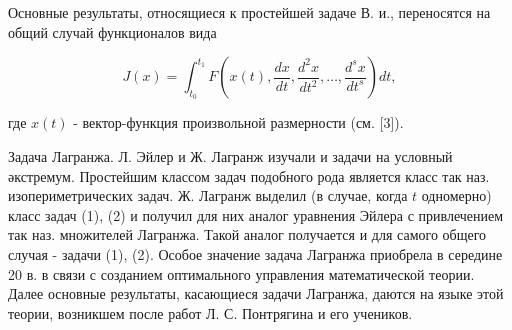 \documentclass[10pt]{article}
\begin{document}
Основные результаты, относящиеся к простейшей задаче В. и., переносятся на общий случай функционалов вида



\[

J(x)=\int_{t_{0}}^{t_{1}} F\left(x(t), \frac{d x}{d t}, \frac{d^{2} x}{d t^{2}}, \ldots, \frac{d^{s} x}{d t^{s}}\right) d t,

\]



где $x(t)$ - вектор-функция произвольной размерности (см. [3]).



Задача Лагранжа. Л. Эйлер и Ж. Лагранж изучали и задачи на условный әкстремум. Простейшим классом задач подобного рода является класс так наз. изопериметрических задач. Ж. Лагранж выделил (в случае, когда $t$ одномерно) класс задач (1), (2) и получил для них аналог уравнения Эйлера с привлечением так наз. множителей Лагранжа. Такой аналог получается и для самого общего случая - задачи (1), (2). Особое значение задача Лагранжа приобрела в середине 20 в. в связи с созданием оптимального управления математической теории. Далее основные результаты, касающиеся задачи Лагранжа, даются на языке этой теории, возникшем после работ Л. С. Понтрягина и его учеников.
\end{document}
